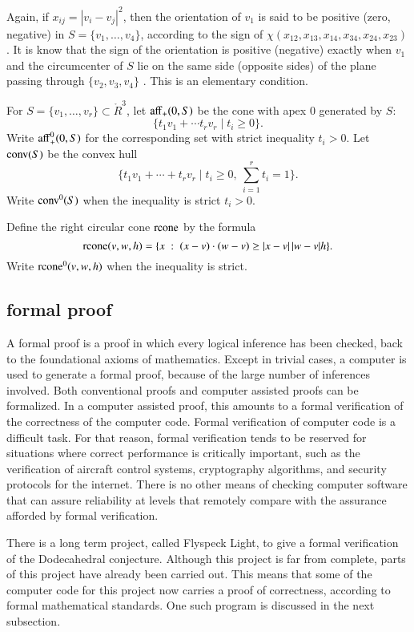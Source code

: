 Again, if $x_{ij}=|v_i-v_j|^2$, then the orientation
of $v_1$ is said to be positive (zero, negative) in $S=\{v_1,\ldots,v_4\}$,
according to the sign of $\chi(x_{12},x_{13},x_{14},x_{34},x_{24},x_{23})$.
It is know that the sign of the orientation is positive (negative) exactly
when $v_1$ and the circumcenter of $S$ lie on the same side (opposite sides) of the
plane passing through $\{v_2,v_3,v_4\}$ \cite[Lemma~5.15]{DCG}.  This is an elementary condition. 

For $S=\{v_1,\ldots,v_r\}\subset\ring{R}^3$, let ${\operatorname{aff}}_+(0,S)$
be the cone with apex $0$ generated by $S$:
  $$
  \{ t_1 v_1 + \cdots t_r v_r \mid  t_i \ge 0\}.
  $$
Write ${\operatorname{aff}}_+^0(0,S)$ for the corresponding set with
strict inequality $t_i >0$.
Let ${\operatorname{conv}}(S)$ be the convex hull
  $$
  \{ t_1 v_1 + \cdots + t_r v_r \mid t_i \ge 0,\ \sum_{i=1}^r t_i=1\}.
  $$
Write ${\operatorname{conv}}^0(S)$ when the inequality is strict $t_i >0$.

Define the right circular cone ${\operatorname{rcone}}$ by the formula
$${\operatorname{rcone}}(v,w,h) = \{x\ :\  (x-v)\cdot (w-v) \ge |x-v|\,|w-v| h\}.$$
Write ${\operatorname{rcone}}^0(v,w,h)$ when the inequality is strict.





\subsection{formal proof}

A formal proof is a proof in which every logical inference has
been checked, back to the foundational axioms of mathematics. 
Except in trivial cases, a computer is used to generate a formal
proof, because of the large number of inferences involved.
Both conventional proofs and computer assisted proofs can be
formalized.  In a computer assisted proof, this amounts to a
formal verification of the correctness of the computer code.
Formal verification of computer code is a difficult task.
For that reason,  formal verification tends to be reserved
for situations where correct performance 
is critically important, such as the verification of aircraft
control systems, cryptography algorithms, 
and security protocols for the internet.
There is no other means of checking 
computer software that can assure reliability at levels that
remotely compare with the
assurance afforded by formal verification. 



There is a long term project, 
called Flyspeck Light, to give a formal verification of the
Dodecahedral conjecture.  Although this project is far from
complete, parts of this project have already
been carried out.  This means that some of the computer code
for this project now carries a proof of correctness,
according to formal mathematical standards.  One such
program is discussed in the next subsection.




